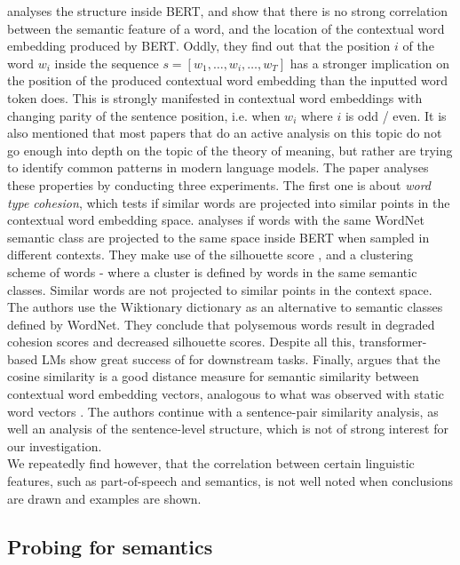 \documentclass[a4paper,12pt,oneside,openright]{report}
\begin{document}
\cite{mickus19} analyses the structure inside BERT, and show that there is no strong correlation between the semantic feature of a word, and the location of the contextual word embedding produced by BERT.
Oddly, they find out that the position $i$ of the word $w_i$ inside the sequence $s = [w_1, \ldots, w_i, \ldots, w_T]$ has a stronger implication on the position of the produced contextual word embedding than the inputted word token does.
This is strongly manifested in contextual word embeddings with changing parity of the sentence position, i.e. when $w_i$ where $i$ is odd / even.
It is also mentioned that most papers that do an active analysis on this topic do not go enough into depth on the topic of the theory of meaning, but rather are trying to identify common patterns in modern language models.
The paper analyses these properties by conducting three experiments.
The first one is about \textit{word type cohesion}, which tests if similar words are projected into similar points in the contextual word embedding space.
\cite{mickus19} analyses if words with the same WordNet semantic class are projected to the same space inside BERT when sampled in different contexts.
They make use of the silhouette score \cite{rousseeuw87}, and a clustering scheme of words - where a cluster is defined by words in the same semantic classes.
Similar words are not projected to similar points in the context space.
The authors use the Wiktionary dictionary \cite{wiktionary} as an alternative to  semantic classes defined by WordNet.
They conclude that polysemous words result in degraded cohesion scores and decreased silhouette scores.
Despite all this, transformer-based LMs show great success of for downstream tasks.
Finally, \cite{mickus19} argues that the cosine similarity is a good distance measure for semantic similarity between contextual word embedding vectors, analogous to what was observed with static word vectors \cite{mikolov13}.
The authors continue with a sentence-pair similarity analysis, as well an analysis of the sentence-level structure, which is not of strong interest for our investigation. \\

We repeatedly find however, that the correlation between certain linguistic features, such as part-of-speech and semantics, is not well noted when conclusions are drawn and examples are shown.

\subsection{Probing for semantics}
\end{document}
